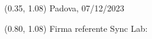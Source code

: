 \documentclass{article}
\begin{document}
\begin{textblock*}{\textwidth}(0.35\textwidth, 1.08\textheight)
    Padova, 07/12/2023
\end{textblock*}

\begin{textblock*}{\textwidth}(0.80\textwidth, 1.08\textheight)
        Firma referente Sync Lab:
\end{textblock*}
\end{document}
